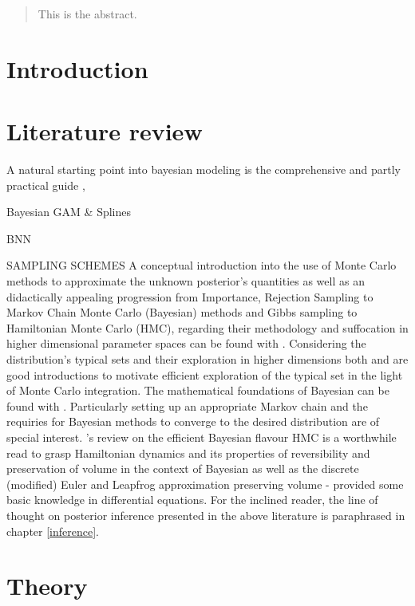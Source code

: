 \documentclass[11pt]{article}
\begin{document}
    \clearpage
    \begin{abstract}
        This is the abstract.
    \end{abstract}

    \section{Introduction}

    \section{Literature review}
    A natural starting point into bayesian modeling is the comprehensive and partly practical guide \cite{gelman2013bayesian},

    Bayesian GAM \& Splines
    \cite{fahrmeir2013regression}

    BNN

    SAMPLING SCHEMES
    A conceptual introduction into the use of Monte Carlo methods to approximate the unknown posterior's quantities as well as an didactically appealing progression from Importance, Rejection Sampling to Markov Chain Monte Carlo (Bayesian) methods and Gibbs sampling to Hamiltonian Monte Carlo (HMC), regarding their methodology and suffocation in higher dimensional parameter spaces can be found with \cite{mackay2003information}. Considering the distribution's typical sets and their exploration in higher dimensions both \cite{mackay2003information} and \cite{betancourt2017conceptual} are good introductions to motivate efficient exploration of the typical set in the light of Monte Carlo integration.
    The mathematical foundations of Bayesian can be found with \cite{brooks2011handbook}. Particularly setting up an appropriate Markov chain and the requiries for Bayesian methods to converge to the desired distribution are of special interest. \cite{neal2011mcmc}'s review on the efficient Bayesian flavour HMC is a worthwhile read to grasp Hamiltonian dynamics and its properties of reversibility and preservation of volume in the context of Bayesian as well as the discrete (modified) Euler and Leapfrog approximation preserving volume - provided some basic knowledge in differential equations. For the inclined reader, the line of thought on posterior inference presented in the above literature is paraphrased in chapter \ref{inference}.


    \clearpage
    \section{Theory}
\end{document}
